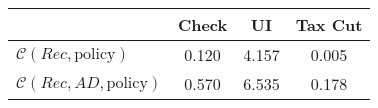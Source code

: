 \begin{tabular}{@{}lccc@{}} 
\toprule 
                          & Check      & UI    & Tax Cut    \\  \midrule 
$\mathcal{C}(Rec,\text{policy})$ & 0.120  & 4.157  & 0.005     \\ 
$\mathcal{C}(Rec, AD,\text{policy})$ & 0.570  & 6.535  & 0.178     \\ 
\end{tabular}  
